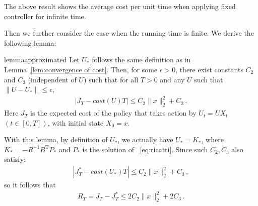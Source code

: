 \documentclass{article}
\theoremstyle{definition}
\begin{document}
The above result shows the average cost per unit time when applying fixed controller for infinite time.


Then we further consider the case when the running time is finite. We derive the following lemma:

\begin{restatable}{lemma}{approximated}
\label{lem:approximated optimal cost}
Let $U_{*}$ follows the same definition as in Lemma~\ref{lem:convergence of cost}. Then, for some $\epsilon>0$, there exist constants $C_{2}$ and $C_{3}$ (independent of $U$) such that for all $T>0$ and any $U$ such that $\|U-U_{*}\|\leq \epsilon$,
\begin{align*}
\left\vert J_{T}-cost(U)T\right\vert\leq C_{2}\|x\|^{2}_{2}+C_{3}\,.
\end{align*}
Here $J_{T}$ is the expected cost of the policy that takes action by $U_{t}=UX_{t}$ $(t\in[0,T])$, with initial state $X_{0}=x$.
\end{restatable}

With this lemma, by definition of $U_{*}$, we actually have $U_{*}=K_{*}$, where $K_{*}=-R^{-1}B^{\mathrm{T}}P_{*}$ and $P_{*}$ is the solution of ~\eqref{eq:ricatti}.
Since such $C_{2},C_{3}$ also satisfy:
\begin{align*}
\left\vert J^{*}_{T}-cost(U_{*})T\right\vert \leq C_{2}\|x\|^{2}_{2}+C_{3}\,,
\end{align*}
so it follows that
\begin{align}
R_{T}=J_{T}-J^{*}_{T}\leq 2C_{2}\|x\|^{2}_{2}+2C_{3}\,.
\end{align}
\end{document}
